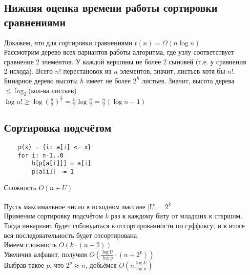 \documentclass[a4paper, 12pt]{article}
\begin{document}
	\subsection*{Нижняя оценка времени работы сортировки сравнениями}
	Докажем, что для сортировки сравнениями $t(n)=\Omega (n\log n)$ \\
	Рассмотрим дерево всех вариантов работы алгоритма, где узлу соответствует сравнение 2 элементов. У каждой вершины не более 2 сыновей (т.е. у сравнения 2 исхода). Всего $n!$ перестановок из $n$ элементов, значит, листьев хотя бы $n!$. Бинарное дерево высоты $h$ имеет не более $2^h$ листьев. Значит, высота дерева $\le \log_2$(кол-ва листьев) \\
	$\log n! \ge \log (\frac{n}{2})^{\frac{n}{2}} = \frac{n}{2} \log \frac{n}{2} = \frac{n}{2}(\log n-1)$ \\
	
	\subsection* {Сортировка подсчётом}
	\begin{lstlisting}
	p(x) = {i: a[i] <= x}
	for i: n-1..0
		b[p[a[i]]] = a[i]
		p[a[i]] -= 1
	\end{lstlisting}
	Сложность $O(n+U)$ \\ \\
	Пусть максимальное число в исходном массиве $|U|=2^k$ \\
	Применим сортировку подсчётом $k$ раз к каждому биту от младших к старшим. Тогда инвариант будет соблюдаться в отсортированности по суффиксу, и в итоге вся последовательность будет отсортирована. \\
	Имеем сложность $O(k\cdot(n+2))$ \\
	Увеличив алфавит, получим $O(\frac{\log U}{\log p}\cdot(n+2^p))$ \\
	Выбрав такое $p$, что $2^p \approx n$, добьёмся $O(n \frac{\log U}{\log n})$
	
	
	
\end{document}

